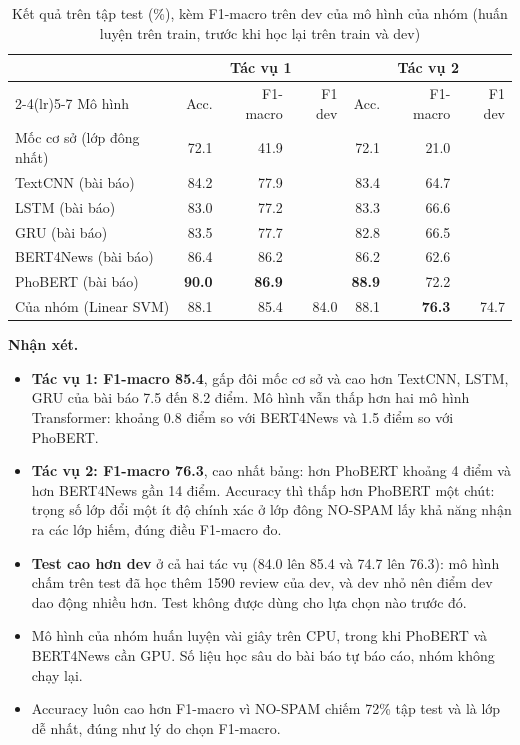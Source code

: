 \begin{table}[H]
\centering
\caption{Kết quả trên tập test (\%), kèm F1-macro trên dev của mô hình của nhóm (huấn luyện trên train, trước khi học lại trên train và dev)}
\label{tab:text-results}
\small
\setlength{\tabcolsep}{4pt}
\begin{tabular}{lrrrrrr}
\toprule
& \multicolumn{3}{c}{Tác vụ 1} & \multicolumn{3}{c}{Tác vụ 2}\\
\cmidrule(lr){2-4}\cmidrule(lr){5-7}
Mô hình & Acc. & F1-macro & F1 dev & Acc. & F1-macro & F1 dev\\
\midrule
Mốc cơ sở (lớp đông nhất) & 72.1 & 41.9 & & 72.1 & 21.0 & \\
TextCNN (bài báo) & 84.2 & 77.9 & & 83.4 & 64.7 & \\
LSTM (bài báo) & 83.0 & 77.2 & & 83.3 & 66.6 & \\
GRU (bài báo) & 83.5 & 77.7 & & 82.8 & 66.5 & \\
BERT4News (bài báo) & 86.4 & 86.2 & & 86.2 & 62.6 & \\
PhoBERT (bài báo) & \textbf{90.0} & \textbf{86.9} & & \textbf{88.9} & 72.2 & \\
Của nhóm (Linear SVM) & 88.1 & 85.4 & 84.0 & 88.1 & \textbf{76.3} & 74.7\\
\bottomrule
\end{tabular}
\end{table}

\textbf{Nhận xét.}
\begin{itemize}[leftmargin=1.5cm]
    \item \textbf{Tác vụ 1: F1-macro 85.4}, gấp đôi mốc cơ sở và cao hơn TextCNN, LSTM, GRU của bài báo 7.5 đến 8.2 điểm. Mô hình vẫn thấp hơn
          hai mô hình Transformer: khoảng 0.8 điểm so với BERT4News và 1.5 điểm so với PhoBERT.
    \item \textbf{Tác vụ 2: F1-macro 76.3}, cao nhất bảng: hơn PhoBERT khoảng 4 điểm và hơn BERT4News gần 14 điểm. Accuracy thì thấp hơn PhoBERT một chút:
          trọng số lớp đổi một ít độ chính xác ở lớp đông NO-SPAM lấy khả năng nhận ra các lớp hiếm, đúng điều F1-macro đo.
    \item \textbf{Test cao hơn dev} ở cả hai tác vụ (84.0 lên 85.4 và 74.7 lên 76.3): mô hình chấm trên test đã học thêm 1590 review của dev, và dev nhỏ
          nên điểm dev dao động nhiều hơn. Test không được dùng cho lựa chọn nào trước đó.
    \item Mô hình của nhóm huấn luyện vài giây trên CPU, trong khi PhoBERT và BERT4News cần GPU. Số liệu học sâu do bài báo tự báo cáo, nhóm không chạy lại.
    \item Accuracy luôn cao hơn F1-macro vì NO-SPAM chiếm 72\% tập test và là lớp dễ nhất, đúng như lý do chọn F1-macro.
\end{itemize}

